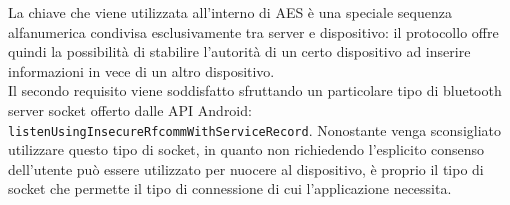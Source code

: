 La chiave che viene utilizzata all'interno di AES è una speciale sequenza alfanumerica condivisa esclusivamente tra server e dispositivo: il protocollo offre quindi la possibilità di stabilire l'autorità di un certo dispositivo ad inserire informazioni in vece di un altro dispositivo.\\

Il secondo requisito viene soddisfatto sfruttando un particolare tipo di bluetooth server socket offerto dalle API Android: \texttt{listenUsingInsecureRfcommWithServiceRecord}. Nonostante venga sconsigliato utilizzare questo tipo di socket, in quanto non richiedendo l'esplicito consenso dell'utente può essere utilizzato per nuocere al dispositivo, è proprio il tipo di socket che permette il tipo di connessione di cui l'applicazione necessita.

